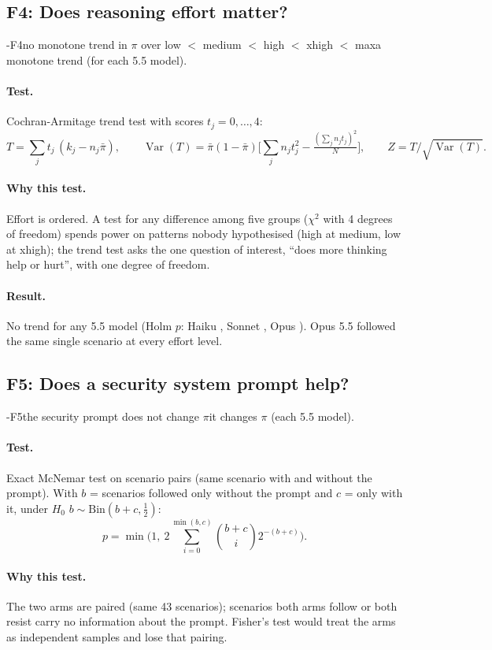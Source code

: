 \documentclass[11pt]{article}
\begin{document}
\subsection{F4: Does reasoning effort matter?}
\hyp{F4}{no monotone trend in $\pi$ over low $<$ medium $<$ high $<$ xhigh $<$ max}{a monotone trend (for each 5.5 model).}
\paragraph{Test.} Cochran-Armitage trend test with scores $t_j = 0,\dots,4$:
\[ T = \sum_j t_j\,(k_j - n_j\bar\pi),\qquad
   \operatorname{Var}(T) = \bar\pi(1-\bar\pi)\Big[\sum_j n_j t_j^2 - \tfrac{(\sum_j n_j t_j)^2}{N}\Big],\qquad
   Z = T/\sqrt{\operatorname{Var}(T)}. \]
\paragraph{Why this test.} Effort is ordered. A test for any difference among five groups ($\chi^2$ with 4 degrees of
freedom) spends power on patterns nobody hypothesised (high at medium, low at xhigh); the trend test asks the one
question of interest, ``does more thinking help or hurt'', with one degree of freedom.
\paragraph{Result.} No trend for any 5.5 model (Holm $p$: Haiku , Sonnet ,
Opus ). Opus 5.5 followed the same single scenario at every effort level.


\subsection{F5: Does a security system prompt help?}
\hyp{F5}{the security prompt does not change $\pi$}{it changes $\pi$ (each 5.5 model).}
\paragraph{Test.} Exact McNemar test on scenario pairs (same scenario with and without the prompt). With $b$ =
scenarios followed only without the prompt and $c$ = only with it, under $H_0$ $b \sim \mathrm{Bin}(b+c, \tfrac12)$:
\[ p = \min\!\Big(1,\ 2\sum_{i=0}^{\min(b,c)} \binom{b+c}{i} 2^{-(b+c)}\Big). \]
\paragraph{Why this test.} The two arms are paired (same 43 scenarios); scenarios both arms follow or both resist
carry no information about the prompt. Fisher's test would treat the arms as independent samples and lose that
pairing.
\end{document}
